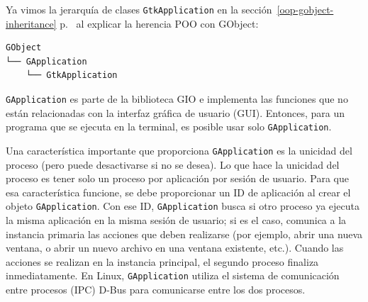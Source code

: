 Ya vimos la jerarquía de clases \lstinline{GtkApplication} en la sección~\ref{oop-gobject-inheritance} p.~\pageref{oop-gobject-inheritance} al explicar la herencia POO con GObject:

\begin{verbatim}
GObject
└── GApplication
    └── GtkApplication
\end{verbatim}

\lstinline{GApplication} es parte de la biblioteca GIO e implementa las funciones que no están relacionadas con la interfaz gráfica de usuario (GUI). Entonces, para un programa que se ejecuta en la terminal, es posible usar solo \lstinline{GApplication}.

Una característica importante que proporciona \lstinline{GApplication} es la unicidad del proceso (pero puede desactivarse si no se desea). Lo que hace la unicidad del proceso es tener solo un proceso por aplicación por sesión de usuario. Para que esa característica funcione, se debe proporcionar un ID de aplicación al crear el objeto \lstinline{GApplication}. Con ese ID, \lstinline{GApplication} busca si otro proceso ya ejecuta la misma aplicación en la misma sesión de usuario; si es el caso, comunica a la instancia primaria las acciones que deben realizarse (por ejemplo, abrir una nueva ventana, o abrir un nuevo archivo en una ventana existente, etc.). Cuando las acciones se realizan en la instancia principal, el segundo proceso finaliza inmediatamente. En Linux, \lstinline{GApplication} utiliza el sistema de comunicación entre procesos (IPC) D-Bus para comunicarse entre los dos procesos.

